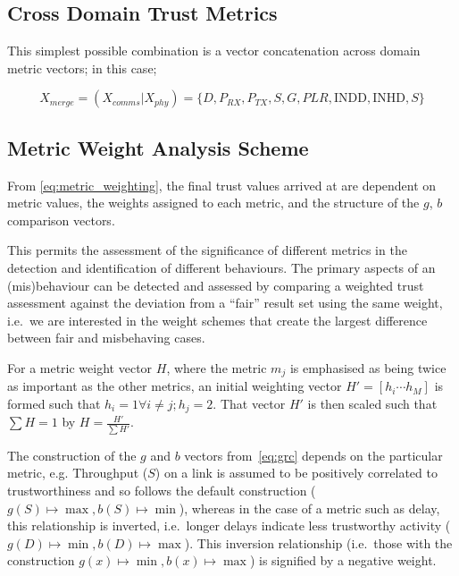 \subsection{Cross Domain Trust Metrics}
This simplest possible combination is a vector concatenation across domain metric vectors; in this case; 

\begin{equation}
  X_{merge} =  (X_{comms}|X_{phy}) = \{D, P_{RX}, P_{TX}, S, G, PLR, \text{INDD}, \text{INHD}, S\}
	\label{eq:phys:vector}
\end{equation}


\subsection{Metric Weight Analysis Scheme}

From \eqref{eq:metric_weighting}, the final trust values arrived at are dependent on metric values, the weights assigned to each metric, and the structure of the $g$, $b$ comparison vectors.

This permits the assessment of the significance of different metrics in the detection and identification of different behaviours. 
The primary aspects of an (mis)behaviour can be detected and assessed by comparing a weighted trust assessment against the deviation from a ``fair'' result set using the same weight, i.e.\ we are interested in the weight schemes that create the largest difference between fair and misbehaving cases.

For a metric weight vector $H$, where the metric $m_j$ is emphasised as being twice as important as the other metrics, an initial weighting vector $H'=[h_i\cdots h_M]$ is formed such that $h_i = 1 \forall i \ne j; h_j=2$. That vector $H'$ is then scaled such that $\sum H = 1$ by $H= \frac{H'}{\sum H'}$.

The construction of the $g$ and $b$ vectors from~\autoref{eq:grc} depends on the particular metric, e.g. Throughput ($S$) on a link is assumed to be positively correlated to trustworthiness and so follows the default construction ($g(S) \mapsto \max, b(S) \mapsto \min$), whereas in the case of a metric such as delay, this relationship is inverted, i.e.\ longer delays indicate less trustworthy activity ($g(D) \mapsto \min, b(D) \mapsto \max$).
This inversion relationship (i.e.\ those with the construction $g(x) \mapsto \min, b(x) \mapsto \max$) is signified by a negative weight.

